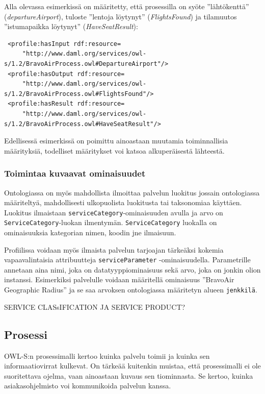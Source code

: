 \documentclass[finnish]{tktltiki2}
\theoremstyle{definition}
\theoremstyle{remark}
\begin{document}
Alla olevassa esimerkissä on määritetty, että prosessilla on syöte ''lähtökenttä'' (\textit{departureAirport}), tuloste ''lentoja löytynyt'' (\textit{FlightsFound}) ja 
tilamuutos ''istumapaikka löytynyt'' (\textit{HaveSeatResult})\cite{daml}:

\footnotesize
\begin{verbatim}
 <profile:hasInput rdf:resource=
     "http://www.daml.org/services/owl-s/1.2/BravoAirProcess.owl#DepartureAirport"/>
 <profile:hasOutput rdf:resource=
     "http://www.daml.org/services/owl-s/1.2/BravoAirProcess.owl#FlightsFound"/>
 <profile:hasResult rdf:resource=
     "http://www.daml.org/services/owl-s/1.2/BravoAirProcess.owl#HaveSeatResult"/>
\end{verbatim}

Edellisessä esimerkissä on poimittu ainoastaan muutamia toiminnallisia määrityksiä, todelliset määritykset voi katsoa alkuperäisestä lähteestä\cite{daml}. 

\subsubsection{Toimintaa kuvaavat ominaisuudet}

Ontologiassa on myös mahdollista ilmoittaa palvelun luokitus jossain ontologiassa määriteltyä, mahdollisesti ulkopuolista luokitusta tai taksonomiaa käyttäen. Luokitus ilmaistaan \texttt{serviceCategory}-ominaisuuden avulla ja arvo on \texttt{ServiceCategory}-luokan ilmentymän.  \texttt{ServiceCategory} luokalla on ominaisuuksia kategorian nimen, koodin jne ilmaisuun\cite{OWLS}.

Profiilissa voidaan myös ilmaista palvelun tarjoajan tärkeäksi kokemia vapaavalintaisia attribuutteja \texttt{serviceParameter} -ominaisuudella. Parametrille annetaan aina nimi, joka on datatyyppiominaisuus sekä arvo, joka on jonkin olion instanssi\cite{OWLS}. Esimerkiksi palvelulle voidaan määritellä ominaisuus ''BravoAir Geographic Radius'' ja se saa arvoksen ontologiassa määritetyn alueen \texttt{jenkkilä}.

SERVICE CLASsIFICATION JA SERVICE PRODUCT?

\subsection{Prosessi}

OWL-S:n prosessimalli kertoo kuinka palvelu toimii ja kuinka sen informaatiovirrat kulkevat.  On tärkeää kuitenkin muistaa, että prosessimalli ei ole suoritettava ojelma, vaan ainoastaan kuvaus sen tiominnasta\cite{OWLS}. Se kertoo, kuinka asiakasohjelmisto voi kommunikoida palvelun kanssa. 
\end{document}
